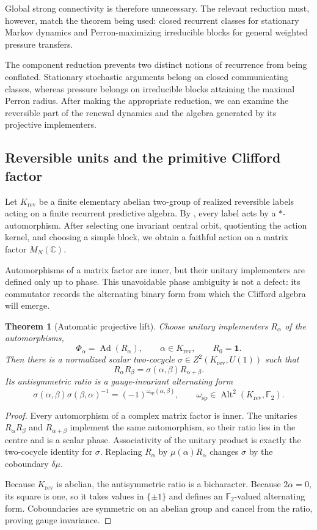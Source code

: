 \documentclass[11pt]{article}
\newtheorem{theorem}{Theorem}[section]
\theoremstyle{definition}
\theoremstyle{remark}
\newcommand{\C}{\mathbb C}
\newcommand{\F}{\mathbb F}
\newcommand{\one}{\mathbf 1}
\newcommand{\Ad}{\operatorname{Ad}}
\newcommand{\Alt}{\operatorname{Alt}}
\newcommand{\rev}{\mathrm{rev}}
\newcommand{\spat}{\mathrm{sp}}
\begin{document}
Global strong connectivity is therefore unnecessary.  The relevant reduction
must, however, match the theorem being used: closed recurrent classes for
stationary Markov dynamics and Perron-maximizing irreducible blocks for general
weighted pressure transfers.

The component reduction prevents two distinct notions of recurrence from being
conflated.  Stationary stochastic arguments belong on closed communicating
classes, whereas pressure belongs on irreducible blocks attaining the maximal
Perron radius.  After making the appropriate reduction, we can examine the
reversible part of the renewal dynamics and the algebra generated by its
projective implementers.

\subsection{Reversible units and the primitive Clifford factor}

Let $K_{\rev}$ be a finite elementary abelian two-group of realized reversible
labels acting on a finite recurrent predictive algebra.  By
, every label acts by a $*$-automorphism.  After
selecting one invariant central orbit, quotienting the action kernel, and
choosing a simple block, we obtain a faithful action on a matrix factor
$M_N(\C)$.

Automorphisms of a matrix factor are inner, but their unitary implementers are
defined only up to phase.  This unavoidable phase ambiguity is not a defect: its
commutator records the alternating binary form from which the Clifford algebra
will emerge.

\begin{theorem}[Automatic projective lift]
\label{thm:projective-lift}
Choose unitary implementers $R_\alpha$ of the automorphisms,
\[
 \Phi_\alpha=\Ad(R_\alpha),
 \qquad \alpha\in K_{\rev},
 \qquad R_0=\one.
\]
Then there is a normalized scalar two-cocycle
$\sigma\in Z^2(K_{\rev},U(1))$ such that
\[
 R_\alpha R_\beta
 =\sigma(\alpha,\beta)R_{\alpha+\beta}.
\]
Its antisymmetric ratio is a gauge-invariant alternating form
\[
 \sigma(\alpha,\beta)\sigma(\beta,\alpha)^{-1}
 =(-1)^{\omega_{\spat}(\alpha,\beta)},
 \qquad
 \omega_{\spat}\in\Alt^2(K_{\rev},\F_2).
\]
\end{theorem}

\begin{proof}
Every automorphism of a complex matrix factor is inner.  The unitaries
$R_\alpha R_\beta$ and $R_{\alpha+\beta}$ implement the same automorphism,
so their ratio lies in the centre and is a scalar phase.  Associativity of the
unitary product is exactly the two-cocycle identity for $\sigma$.  Replacing
$R_\alpha$ by $\mu(\alpha)R_\alpha$ changes $\sigma$ by the coboundary
$\delta\mu$.

Because $K_{\rev}$ is abelian, the antisymmetric ratio is a bicharacter.
Because $2\alpha=0$, its square is one, so it takes values in $\{\pm1\}$ and
defines an $\F_2$-valued alternating form.  Coboundaries are symmetric on an
abelian group and cancel from the ratio, proving gauge invariance.
\end{proof}
\end{document}
